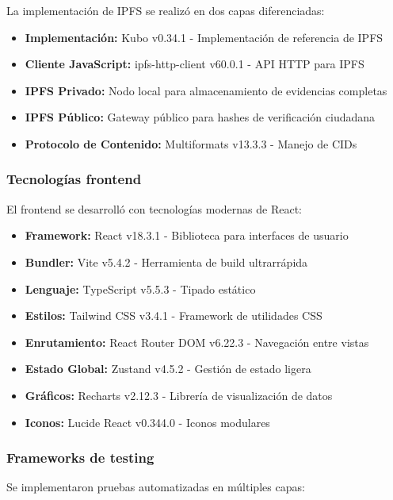 La implementación de IPFS se realizó en dos capas diferenciadas:

\begin{itemize}
    \item \textbf{Implementación:} Kubo v0.34.1 - Implementación de referencia de IPFS
    \item \textbf{Cliente JavaScript:} ipfs-http-client v60.0.1 - API HTTP para IPFS
    \item \textbf{IPFS Privado:} Nodo local para almacenamiento de evidencias completas
    \item \textbf{IPFS Público:} Gateway público para hashes de verificación ciudadana
    \item \textbf{Protocolo de Contenido:} Multiformats v13.3.3 - Manejo de CIDs
\end{itemize}

\subsubsection{Tecnologías frontend}

El frontend se desarrolló con tecnologías modernas de React:

\begin{itemize}
    \item \textbf{Framework:} React v18.3.1 - Biblioteca para interfaces de usuario
    \item \textbf{Bundler:} Vite v5.4.2 - Herramienta de build ultrarrápida
    \item \textbf{Lenguaje:} TypeScript v5.5.3 - Tipado estático
    \item \textbf{Estilos:} Tailwind CSS v3.4.1 - Framework de utilidades CSS
    \item \textbf{Enrutamiento:} React Router DOM v6.22.3 - Navegación entre vistas
    \item \textbf{Estado Global:} Zustand v4.5.2 - Gestión de estado ligera
    \item \textbf{Gráficos:} Recharts v2.12.3 - Librería de visualización de datos
    \item \textbf{Iconos:} Lucide React v0.344.0 - Iconos modulares
\end{itemize}

\subsubsection{Frameworks de testing}

Se implementaron pruebas automatizadas en múltiples capas:

